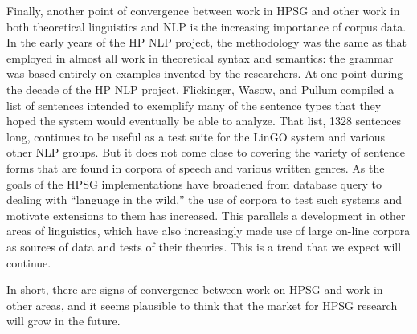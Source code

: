 \documentclass[output=paper]{langsci/langscibook}
\begin{document}
Finally, another point of convergence between work in HPSG and other work in both theoretical linguistics and NLP is the increasing importance of corpus data. In the early years of the HP NLP project, the methodology was the same as that employed in almost all work in theoretical syntax and semantics:  the grammar was based entirely on examples invented by the researchers.  At one point during the decade of the HP NLP project, Flickinger, Wasow, and Pullum compiled a list of sentences intended to exemplify many of the sentence types that they hoped the system would eventually be able to analyze.  That list, 1328 sentences long, continues to be useful as a test suite for the LinGO system and various other NLP groups.  But it does not come close to covering the variety of sentence forms that are found in corpora of speech and various written genres.  As the goals of the HPSG implementations have broadened from database query to dealing with ``language in the wild,'' the use of corpora to test such systems and motivate extensions to them has increased.  This parallels a development in other areas of linguistics, which have also increasingly made use of large on-line corpora as sources of data and tests of
their theories.  This is a trend that we expect will continue.
 
In short, there are signs of convergence between work on HPSG and work in other areas, and it seems plausible to think that the market for HPSG research will grow in the future.

{\sloppy
\printbibliography[heading=subbibliography,notkeyword=this]
}
\end{document}
